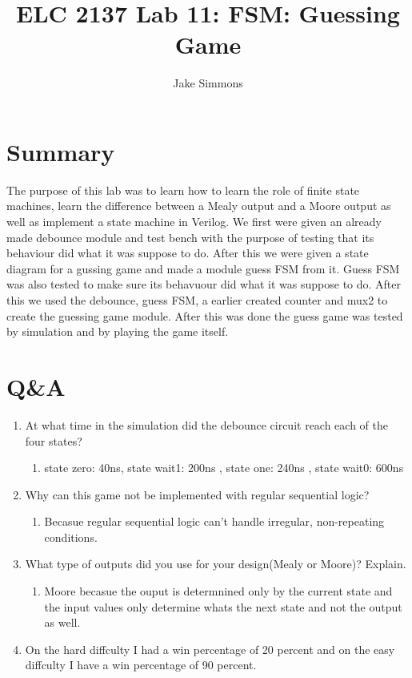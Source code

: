 \documentclass[11pt]{article}
\begin{document}
\title{ELC 2137 Lab 11: FSM: Guessing Game}
\author{Jake Simmons}

\maketitle


\section*{Summary}

The purpose of this lab was to learn how to learn the role of finite state machines, learn the difference between a Mealy output and a Moore output as well as implement a state machine in Verilog. We first were given an already made debounce module and test bench with the purpose of testing that its behaviour did what it was suppose to do. After this we were given a state diagram for a gussing game and made a module guess FSM from it. Guess FSM was also tested to make sure its behavuour did what it was suppose to do. After this we used the debounce, guess FSM, a earlier created counter and mux2 to create the guessing game module. After this was done the guess game was tested by simulation and by playing the game itself. 

\clearpage
\section*{Q\&A}

\begin{enumerate}
		\item At what time in the simulation did the debounce circuit reach each of the four states?
		\begin{enumerate}
			\item 	state zero: 40ns, state wait1: 200ns , state one: 240ns , state wait0: 600ns 
		\end{enumerate}
	
	\item Why can this game not be implemented with regular sequential logic?
		\begin{enumerate}
			\item 	Becasue regular sequential logic can't handle irregular, non-repeating conditions.
		\end{enumerate}

	\item What type of outputs did you use for your design(Mealy or Moore)? Explain.
	\begin{enumerate}
		\item Moore becasue the ouput is determnined only by the current state and the input values only determine whats the next state and not the output as well. 
	\end{enumerate}
	\item On the hard diffculty I had a win percentage of 20 percent and on the easy diffculty I have a win percentage of 90 percent.
\end{enumerate}
\end{document}
